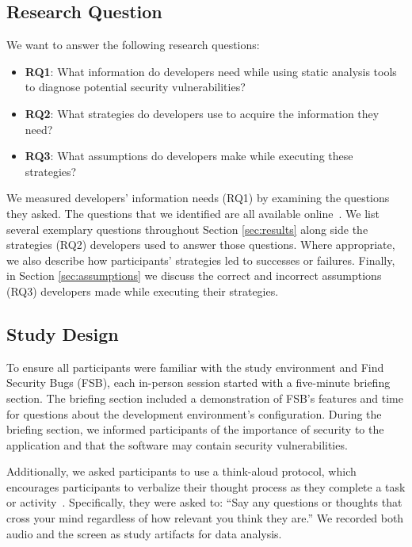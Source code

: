 \documentclass[10pt,journal,compsoc]{IEEEtran}
\begin{document}
\subsection{Research Question}
\label{rqs}
We want to answer the following research questions:
\begin{itemize}
	\item \textbf{RQ1}: What information do developers need while using static analysis tools to diagnose potential security vulnerabilities? 
	\item \textbf{RQ2}: What strategies do developers use to acquire the information they need?
	\item \textbf{RQ3}: What assumptions do developers make while executing these strategies?
	\end{itemize}
We measured developers' information needs (RQ1) by examining the questions they asked.
The questions that we identified are all available online~\cite{ExperimentalMaterials}.
We list several exemplary questions throughout Section \ref{sec:results} along side the strategies (RQ2) developers used to answer those questions.
Where appropriate, we also describe how participants' strategies led to successes or failures.
Finally, in Section \ref{sec:assumptions} we discuss the correct and incorrect assumptions (RQ3) developers made while executing their strategies. 


\subsection{Study Design}
\label{studyDesign}
To ensure all participants were familiar with the study environment and Find Security Bugs (FSB),
each in-person session started with a five-minute briefing section.
The briefing section included a demonstration of FSB's features and time for questions about the development environment's configuration.
During the briefing section, we informed participants of the importance of security to the application and that the software may contain security vulnerabilities.

Additionally, we asked participants to use a think-aloud protocol, which encourages  participants to verbalize their thought process as they complete a task or activity~\cite{nielsen2002getting}. 
Specifically, they were asked to: ``Say any questions or thoughts that cross your mind regardless of how relevant you think they are.''
We recorded both audio and the screen as study artifacts for data analysis.
\end{document}
